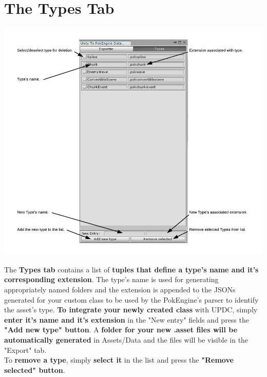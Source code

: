 \documentclass[10pt,a4paper]{article}
\begin{document}
\section{The Types Tab}
\begin{center}
\includegraphics[scale=0.55]{typesUi}
\end{center}
The \textbf{Types tab} contains a list of \textbf{tuples that define a type's name and it's corresponding extension}.
The type's name is used for generating appropriately named folders and the extension is appended to the JSONs generated for your custom class to be used by the PokEngine's parser to identify the asset's type.
\textbf{To integrate your newly created class} with UPDC, simply \textbf{enter it's name and it's extension} in the "New entry" fields and press the \textbf{"Add new type" button}.
A \textbf{folder for your new .asset files will be automatically generated} in Assets/Data and the files will be visible in the "Export" tab.\\
To \textbf{remove a type}, simply \textbf{select it} in the list and press the \textbf{"Remove selected" button}.
\end{document}
